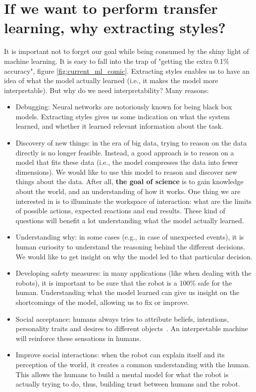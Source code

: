 \section{If we want to perform transfer learning, why extracting styles?}
  \par It is important not to forget our goal while being consumed by the shiny light of machine learning. It is easy to fall into the trap of "getting the extra 0.1\% accuracy", figure \ref{fig:current_ml_comic}. Extracting styles enables us to have an idea of what the model actually learned (i.e., it makes the model more interpretable). But why do we need interpretability? Many reasons:
  \begin{itemize}
    \item Debugging: Neural networks are notoriously known for being black box models. Extracting styles gives us some indication on what the system learned, and whether it learned relevant information about the task.

    \item Discovery of new things: in the era of big data, trying to reason on the data directly is no longer feasible. Instead, a good approach is to reason on a model that fits these data (i.e., the model compresses the data into fewer dimensions). We would like to use this model to reason and discover new things about the data. After all, \textbf{the goal of science} is to gain knowledge about the world, and an understanding of how it works. One thing we are interested in is to illuminate the workspace of interaction: what are the limits of possible actions, expected reactions and end results. These kind of questions will benefit a lot understanding what the model actually learned.

    \item Understanding why: in some cases (e.g., in case of unexpected events), it is human curiosity to understand the reasoning behind the different decisions. We would like to get insight on why the model led to that particular decision.

    \item Developing safety measures: in many applications (like when dealing with the robots), it is important to be sure that the robot is a 100\% safe for the human. Understanding what the model learned can give us insight on the shortcomings of the model, allowing us to fix or improve.

    \item Social acceptance: humans always tries to attribute beliefs, intentions, personality traits and desires to different objects~\citep{heider1944experimental}. An interpretable machine will reinforce these sensations in humans.

    \item Improve social interactions: when the robot can explain itself and its perception of the world, it creates a common understanding with the human. This allows the humans to build a mental model for what the robot is actually trying to do, thus, building trust between humans and the robot.
  \end{itemize}

